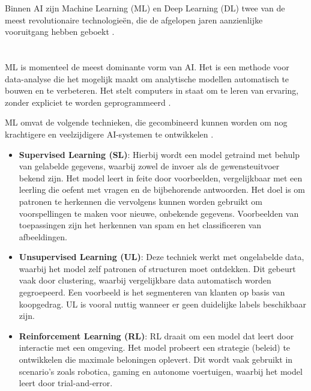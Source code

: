 Binnen AI zijn Machine Learning (ML) en Deep Learning (DL) twee van de meest revolutionaire technologieën, die de afgelopen jaren aanzienlijke vooruitgang hebben geboekt \autocite{SharifaniEtAl2023}.

\section{}%
\label{sec:machine-learning}

ML is momenteel de meest dominante vorm van AI. Het is een methode voor data-analyse die het mogelijk maakt om analytische modellen automatisch te bouwen en te verbeteren. Het stelt computers in staat om te leren van ervaring, zonder expliciet te worden geprogrammeerd \autocite{SharifaniEtAl2023}.

ML omvat de volgende technieken, die gecombineerd kunnen worden om nog krachtigere en veelzijdigere AI-systemen te ontwikkelen \autocite{Kouassi2023}. 

\begin{itemize}
  \item \textbf{Supervised Learning (SL)}: Hierbij wordt een model getraind met behulp van gelabelde gegevens, waarbij zowel de invoer als de gewensteuitvoer bekend zijn. Het model leert in feite door voorbeelden, vergelijkbaar met een leerling die oefent met vragen en de bijbehorende antwoorden. Het doel is om patronen te herkennen die vervolgens kunnen worden gebruikt om voorspellingen te maken voor nieuwe, onbekende gegevens. Voorbeelden van toepassingen zijn het herkennen van spam en het classificeren van afbeeldingen.
  \item \textbf{Unsupervised Learning (UL)}: Deze techniek werkt met ongelabelde data, waarbij het model zelf patronen of structuren moet ontdekken. Dit gebeurt vaak door clustering, waarbij vergelijkbare data automatisch worden gegroepeerd. Een voorbeeld is het segmenteren van klanten op basis van koopgedrag. UL is vooral nuttig wanneer er geen duidelijke labels beschikbaar zijn. 
  \item \textbf{Reinforcement Learning (RL)}: RL draait om een model dat leert door interactie met een omgeving. Het model probeert een strategie (beleid) te ontwikkelen die maximale beloningen oplevert. Dit wordt vaak gebruikt in scenario's zoals robotica, gaming en autonome voertuigen, waarbij het model leert door trial-and-error. 
\end{itemize}

\section{}%
\label{sec:deep-learning}

